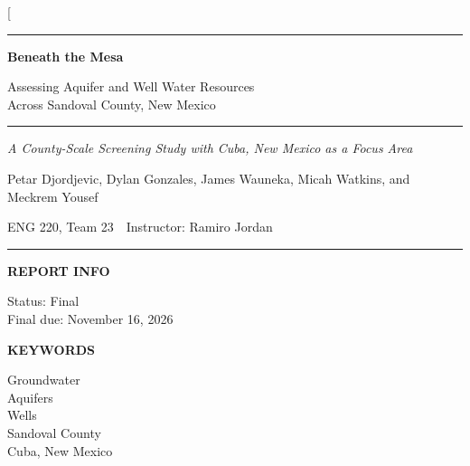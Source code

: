 \documentclass[10pt,twocolumn,letterpaper]{article}
\newif\ifroughdraft \roughdraftfalse    %
\newcommand{\draftstamp}[1][\large]{\ifroughdraft%
  \tikz\node[draw=draftred,line width=1.1pt,rounded corners=2pt,inner xsep=9pt,inner ysep=4pt,
    text=draftred,font=#1\bfseries]{\textls[180]{ROUGH DRAFT}};\fi}
\newcommand{\infohead}[1]{{\color{titleblue}\footnotesize\bfseries\MakeUppercase{#1}}\par\vspace{2pt}}
\begin{document}
\twocolumn[{%
\begin{center}
  \ifroughdraft\vspace*{-1.5ex}\draftstamp\par\vspace{1.4ex}\fi
  {\color{accentblue}\rule{\textwidth}{0.8pt}}\par\vspace{0.9ex}
  {\color{titleblue}\fontsize{22}{26}\selectfont\bfseries Beneath the Mesa\par}
  \vspace{0.7ex}
  {\color{accentblue}\fontsize{14.5}{18}\selectfont Assessing Aquifer and Well Water Resources\\
    Across Sandoval County, New Mexico\par}
  \vspace{0.9ex}
  {\color{accentblue}\rule{\textwidth}{0.8pt}}\par\vspace{0.9ex}
  {\itshape A County-Scale Screening Study with Cuba, New Mexico as a Focus Area\par}
  \vspace{2.0ex}
  {\large Petar Djordjevic, Dylan Gonzales, James Wauneka, Micah Watkins, and Meckrem Yousef\par}
  \vspace{0.6ex}
  {\small ENG 220, Team 23 \,\textbullet\, Instructor: Ramiro Jordan\par}
\end{center}
\vspace{1.2ex}
{\color{accentblue}\rule{\textwidth}{0.4pt}}\par\vspace{1.4ex}
\noindent
\begin{minipage}[t]{0.25\textwidth}
  \raggedright\footnotesize
  \infohead{Report info}
  \ifroughdraft Status: {\color{draftred}\bfseries Rough draft}\\
  Date: November 4, 2026\\
  \else Status: Final\\
  \fi Final due: November 16, 2026\par\vspace{1.4ex}
  \infohead{Keywords}
  Groundwater\\ Aquifers\\ Wells\\ Sandoval County\\ Cuba, New Mexico\par\vspace{1.4ex}

\end{minipage}}
\end{document}
